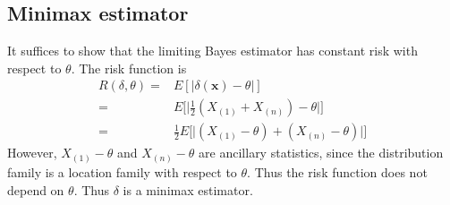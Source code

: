 \documentclass{article}
\begin{document}
\subsection{Minimax estimator}
It suffices to show that the limiting Bayes estimator has constant risk with respect to $\theta$.
The risk function is
\begin{align*}
  R(\delta, \theta)
  = & E[|\delta(\bm{x}) - \theta|] \\
  = & E\Big[\big|\frac{1}{2}(X_{(1)} + X_{(n)}) - \theta\big|\Big] \\
  = & \frac{1}{2}E\Big[\big|(X_{(1)} - \theta) + (X_{(n)} - \theta)\big|\Big] 
\end{align*}
However, $X_{(1)} - \theta$ and $X_{(n)} - \theta$ are ancillary statistics,
since the distribution family is a location family with respect to $\theta$.
Thus the risk function does not depend on $\theta$.
Thus $\delta$ is a minimax estimator.
\end{document}
